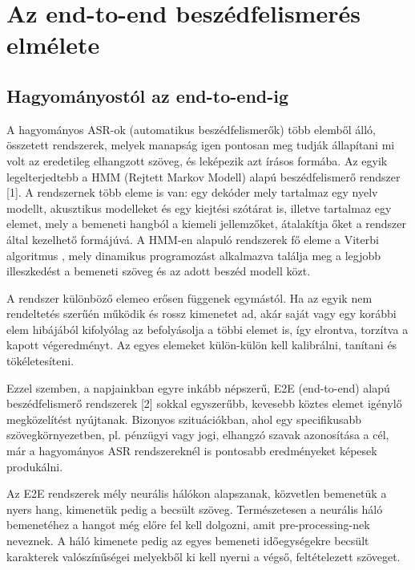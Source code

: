 \chapter{Az end-to-end beszédfelismerés elmélete}

\section{Hagyományostól az end-to-end-ig}

A hagyományos ASR-ok (automatikus beszédfelismerők) több elemből álló, összetett rendszerek, melyek manapság igen pontosan meg tudják állapítani mi volt az eredetileg elhangzott szöveg, és leképezik azt írásos formába. Az egyik legelterjedtebb a HMM (Rejtett Markov Modell) alapú beszédfelismerő rendszer [1]. A rendszernek több eleme is van: egy dekóder mely tartalmaz egy nyelv modellt, akusztikus modelleket és egy kiejtési szótárat is, illetve tartalmaz egy elemet, mely a bemeneti hangból a kiemeli jellemzőket, átalakítja őket a rendszer által kezelhető formájúvá. A HMM-en alapuló rendszerek fő eleme a Viterbi algoritmus \cite{viterbi}, mely dinamikus programozást alkalmazva találja meg a legjobb illeszkedést a bemeneti szöveg és az adott beszéd modell közt.

A rendszer különböző elemeo erősen függenek egymástól. Ha az egyik nem rendeltetés szerűén működik és rossz kimenetet ad, akár saját vagy egy korábbi elem hibájából kifolyólag az befolyásolja a többi elemet is, így elrontva, torzítva a kapott végeredményt. Az egyes elemeket külön-külön kell kalibrálni, tanítani és tökéletesíteni.

Ezzel szemben, a napjainkban egyre inkább népszerű, E2E (end-to-end) alapú beszédfelismerő rendszerek [2] sokkal egyszerűbb, kevesebb köztes elemet igénylő megközelítést nyújtanak. Bizonyos szituációkban, ahol egy specifikusabb szövegkörnyezetben, pl. pénzügyi vagy jogi, elhangzó szavak azonosítása a cél, már a hagyományos ASR rendszereknél is pontosabb eredményeket képesek produkálni.

Az E2E rendszerek mély neurális hálókon alapszanak, közvetlen bemenetük a nyers hang, kimenetük pedig a becsült szöveg. Természetesen a neurális háló bemenetéhez a hangot még előre fel kell dolgozni, amit pre-processing-nek neveznek. A háló kimenete pedig az egyes bemeneti időegységekre becsült karakterek valószínűségei melyekből ki kell nyerni a végső, feltételezett szöveget.

